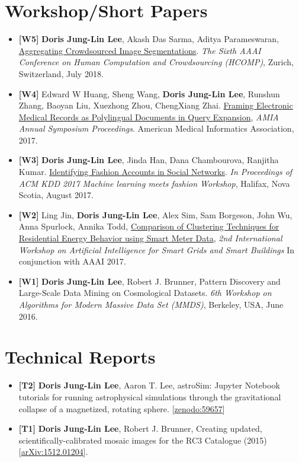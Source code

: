 \documentclass{res}
\begin{document}
\begin{resume}
\section{Workshop/Short Papers}
\begin{itemize}[leftmargin=0in,label={}]
\item \textbf{[W5]} \textbf{Doris Jung-Lin Lee}, Akash Das Sarma, Aditya Parameswaran, \href{http://ceur-ws.org/Vol-2173/paper10.pdf}{Aggregating Crowdsourced Image Segmentations}. \textit{The Sixth AAAI Conference on Human Computation and Crowdsourcing (HCOMP)}, Zurich, Switzerland, July 2018.
\item \textbf{[W4]} Edward W Huang, Sheng Wang, \textbf{Doris Jung-Lin Lee}, Runshun Zhang, Baoyan Liu, Xuezhong Zhou, ChengXiang Zhai. \href{https://amia2017.zerista.com/event/member/389402}{Framing Electronic Medical Records as Polylingual Documents in Query Expansion}, \textit{AMIA Annual Symposium Proceedings}. American Medical Informatics Association, 2017.
\item \textbf{[W3]} \textbf{Doris Jung-Lin Lee}, Jinda Han, Dana Chambourova, Ranjitha Kumar. \href{https://kddfashion2017.mybluemix.net/final_submissions/ML4Fashion_paper_21.pdf}{Identifying Fashion Accounts in Social Networks}.  \textit{In Proceedings of ACM KDD 2017 Machine learning meets fashion Workshop}, Halifax, Nova Scotia, August 2017.
\item \textbf{[W2]} Ling Jin, \textbf{Doris Jung-Lin Lee}, Alex Sim, Sam Borgeson, John Wu, Anna Spurlock, Annika Todd, \href{https://aaai.org/ocs/index.php/WS/AAAIW17/paper/view/15166}{Comparison of Clustering Techniques for Residential Energy Behavior using Smart Meter Data}, \textit{2nd International Workshop on Artificial Intelligence for Smart Grids and Smart Buildings} In conjunction with AAAI 2017.
\item \textbf{[W1]} \textbf{Doris Jung-Lin Lee}, Robert J. Brunner, Pattern Discovery and Large-Scale Data Mining on Cosmological Datasets. \textit{6th Workshop on Algorithms for Modern Massive Data Set (MMDS)}, Berkeley, USA, June 2016.
\end{itemize}
\vspace{-10pt}
\section{Technical Reports}
\begin{itemize}[leftmargin=0in,label={}]
\item \textbf{[T2]} \textbf{Doris Jung-Lin Lee}, Aaron T. Lee, astroSim: Jupyter Notebook tutorials for running astrophysical simulations through the gravitational collapse of a magnetized, rotating sphere. [\href{http://doi.org/10.5281/zenodo.59657}{zenodo:59657}]
\item \textbf{[T1]}  \textbf{Doris Jung-Lin Lee}, Robert J. Brunner, Creating updated, scientifically-calibrated mosaic images for the RC3 Catalogue (2015) [\href{http://arxiv.org/abs/1512.01204}{arXiv:1512.01204}]. 
\end{itemize}
\vspace{-10pt}

\end{resume}
\end{document}
